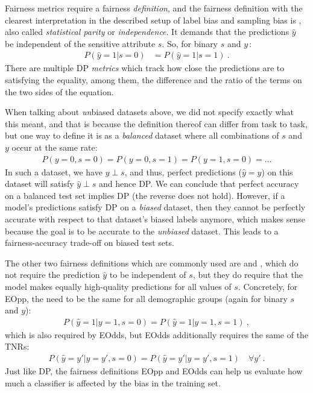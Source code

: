 Fairness metrics require a fairness \emph{definition},
and the fairness definition with the clearest interpretation in the described setup of label bias and sampling bias is ,
also called \emph{statistical parity} or \emph{independence}.
It demands that the predictions $\hat{y}$\, be independent of the sensitive attribute \(s\).
So, for binary $s$ and $y$\,:
\begin{align}
  P(\hat{y}=1|s=0) &= P(\hat{y}=1|s=1)~.
  \label{eq:dp-def}
\end{align}
There are multiple \ac{DP} \emph{metrics} which track how close the predictions are to satisfying the equality,
among them, the difference and the ratio of the terms on the two sides of the equation.

When talking about \emph{un}biased datasets above,
we did not specify exactly what this meant,
and that is because the definition thereof can differ from task to task,
but one way to define it is as a \emph{balanced} dataset where all combinations of $s$ and $y$ occur at the same rate:
\begin{align}
  \label{eq:balanced-dataset}
  P(y=0,s=0)=P(y=0,s=1)=P(y=1,s=0)=\dots
\end{align}
In such a dataset, we have $y \perp s$, and thus,
perfect predictions ($\hat{y}=y$) on this dataset will satisfy $\hat{y} \perp s$ and hence \ac{DP}.
We can conclude that perfect accuracy on a balanced test set implies \acl{DP}
(the reverse does not hold).
However, if a model's predictions satisfy \ac{DP} on a \emph{biased} dataset,
then they cannot be perfectly accurate with respect to that dataset's biased labels anymore,
which makes sense because the goal is to be accurate to the \emph{unbiased} dataset.
This leads to a fairness-accuracy trade-off on biased test sets.

The other two fairness definitions which are commonly used are  and ,
which do not require the prediction $\hat{y}$ to be independent of $s$,
but they do require that the model makes equally high-quality predictions for all values of $s$.
Concretely, for \ac{EOpp}, the  need to be the same for all demographic groups
(again for binary $s$ and $y$):
\begin{align}
  \label{eq:eopp-def}
  P(\hat{y}=1|y=1,s=0) = P(\hat{y}=1|y=1,s=1)~,
\end{align}
which is also required by \ac{EOdds}, but \ac{EOdds} additionally requires the same of the \acp{TNR}:
\begin{align}
  P(\hat{y}=y'|y=y',s=0) = P(\hat{y}=y'|y=y',s=1)\quad\forall y'~.
  \label{eq:eodds-def}
\end{align}
Just like \ac{DP},
the fairness definitions \ac{EOpp} and \ac{EOdds} can help us evaluate
how much a classifier is affected by the bias in the training set.

